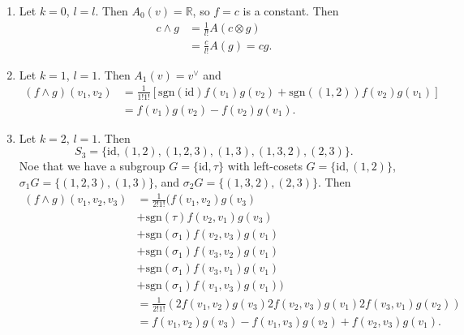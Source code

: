\begin{xmpl}
  \begin{enumerate}
    \item{
      Let $k = 0$, $l = l$. Then $A_0(v) = \mathbb{R}$, so $f = c$ is a
      constant. Then
      \begin{align*}
         c \wedge g
      &= \frac{1}{l!}
         A(c \otimes g) \\
      &= \frac{c}{l!}
           A(g)
       = c g.
      \end{align*}
    }
    \item{
      Let $k = 1$, $l = 1$. Then
      $A_1(v) = v^\vee$ and
      \begin{align*}
         (f \wedge g)(v_1, v_2)
      &= \frac{1}{1! 1!}
           \left[
             \mathrm{sgn}(\mathrm{id})
             f(v_1)g(v_2)
           + \mathrm{sgn}((1,2))
             f(v_2)g(v_1)
           \right] \\
      &= f(v_1)g(v_2) - f(v_2)g(v_1).
      \end{align*}
    }
    \item{
      Let $k = 2$, $l = 1$. Then
      $$
        S_3
      = \{ \mathrm{id}
         , (1, 2)
         , (1, 2, 3)
         , (1, 3)
         , (1, 3, 2)
         , (2, 3)
        \}.
      $$
      Noe that we have a subgroup $G = \{\mathrm{id}, \tau\}$ with
      left-cosets $G = \{\mathrm{id}, (1,2)\}$,
      $\sigma_1 G = \{ (1, 2, 3), (1, 3) \}$, and
      $\sigma_2 G = \{ (1, 3, 2), (2, 3) \}$. Then
      \begin{align*}
         (f \wedge g)(v_1, v_2, v_3)
      &= \frac{1}{2! 1!}
        (f(v_1, v_2) g(v_3) \\
      &+ \mathrm{sgn}(\tau)
         f(v_2, v_1)
         g(v_3) \\
      &+ \mathrm{sgn}(\sigma_1)
         f(v_2, v_3)
         g(v_1) \\
      &+ \mathrm{sgn}(\sigma_1)
         f(v_3, v_2)
         g(v_1) \\
      &+ \mathrm{sgn}(\sigma_1)
         f(v_3, v_1)
         g(v_1) \\
      &+ \mathrm{sgn}(\sigma_1)
         f(v_1, v_3)
         g(v_1)) \\
      &= \frac{1}{2! 1!}(
         2 f(v_1, v_2) g(v_3)
         2 f(v_2, v_3) g(v_1)
         2 f(v_3, v_1) g(v_2)) \\
      &= f(v_1, v_2) g(v_3)
       - f(v_1, v_3) g(v_2)
       + f(v_2, v_3) g(v_1).
      \end{align*}

}
\end{enumerate}
\end{xmpl}
